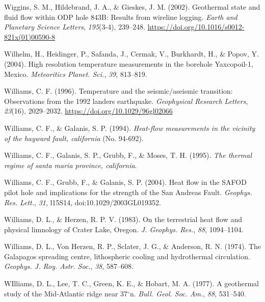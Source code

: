 \begin{CSLReferences}{1}{1}
\leavevmode{}%
Wiggins, S. M., Hildebrand, J. A., \& Gieskes, J. M. (2002). Geothermal state and fluid flow within ODP hole 843B: Results from wireline logging. \emph{Earth and Planetary Science Letters}, \emph{195}(3-4), 239--248. \url{https://doi.org/10.1016/s0012-821x(01)00590-8}

\leavevmode{}%
Wilhelm, H., Heidinger, P., Safanda, J., Cermak, V., Burkhardt, H., \& Popov, Y. (2004). High resolution temperature measurements in the borehole {Yaxcopoil-1, Mexico}. \emph{Meteoritics Planet. Sci.}, \emph{39}, 813--819.

\leavevmode{}%
Williams, C. F. (1996). Temperature and the seismic/aseismic transition: Observations from the 1992 landers earthquake. \emph{Geophysical Research Letters}, \emph{23}(16), 2029--2032. \url{https://doi.org/10.1029/96gl02066}

\leavevmode{}%
Williams, C. F., \& Galanis, S. P. (1994). \emph{Heat-flow measurements in the vicinity of the hayward fault, california} (No. 94-692).

\leavevmode{}%
Williams, C. F., Galanis, S. P., Grubb, F., \& Moses, T. H. (1995). \emph{The thermal regime of santa maria province, california}.

\leavevmode{}%
Williams, C. F., Grubb, F., \& Galanis, S. P. (2004). Heat flow in the {SAFOD} pilot hole and implications for the strength of the {San Andreas Fault}. \emph{Geophys. Res. Lett.}, \emph{31}, l15S14, doi:10.1029/2003GL019352.

\leavevmode{}%
Williams, D. L., \& Herzen, R. P. V. (1983). On the terrestrial heat flow and physical limnology of {Crater Lake, Oregon}. \emph{J. Geophys. Res.}, \emph{88}, 1094--1104.

\leavevmode{}%
Williams, D. L., Von Herzen, R. P., Sclater, J. G., \& Anderson, R. N. (1974). The {Galapagos} spreading centre, lithospheric cooling and hydrothermal circulation. \emph{Geophys. J. Roy. Astr. Soc.}, \emph{38}, 587--608.

\leavevmode{}%
WIlliams, D. L., Lee, T. C., Green, K. E., \& Hobart, M. A. (1977). A geothermal study of the {Mid-Atlantic} ridge near 37\(^\circ\)n. \emph{Bull. Geol. Soc. Am.}, \emph{88}, 531--540.


\end{CSLReferences}
